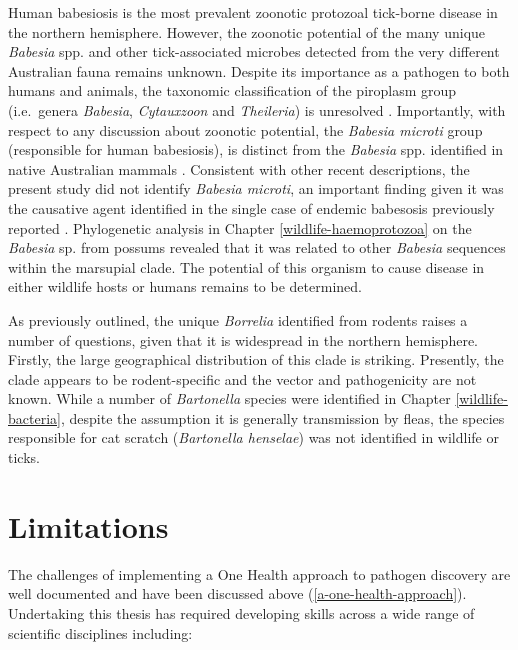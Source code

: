 \documentclass[a4paper, nobind]{templates/ociamthesis}
\begin{document}
Human babesiosis is the most prevalent zoonotic protozoal tick-borne disease in the northern hemisphere.
However, the zoonotic potential of the many unique \emph{Babesia} spp. and other tick-associated microbes detected from the very different Australian fauna remains unknown.
Despite its importance as a pathogen to both humans and animals, the taxonomic classification of the piroplasm group (i.e.~genera \emph{Babesia}, \emph{Cytauxzoon} and \emph{Theileria}) is unresolved \autocite{papariniFirstMolecularCharacterization2015,schreegMitochondrialGenomeSequences2016,barbosaSequenceAnalysesMitochondrial2019}.
Importantly, with respect to any discussion about zoonotic potential, the \emph{Babesia microti} group (responsible for human babesiosis), is distinct from the \emph{Babesia} spp. identified in native Australian mammals \autocite{schreegMitochondrialGenomeSequences2016,barbosaSequenceAnalysesMitochondrial2019}.
Consistent with other recent descriptions, the present study did not identify \emph{Babesia microti}, an important finding given it was the causative agent identified in the single case of endemic babesosis previously reported \autocite{senanayakeFirstReportHuman2012}.
Phylogenetic analysis in Chapter \ref{wildlife-haemoprotozoa} on the \emph{Babesia} sp. from possums revealed that it was related to other \emph{Babesia} sequences within the marsupial clade.
The potential of this organism to cause disease in either wildlife hosts or humans remains to be determined.

As previously outlined, the unique \emph{Borrelia} identified from rodents raises a number of questions, given that it is widespread in the northern hemisphere.
Firstly, the large geographical distribution of this clade is striking.
Presently, the clade appears to be rodent-specific and the vector and pathogenicity are not known.
While a number of \emph{Bartonella} species were identified in Chapter \ref{wildlife-bacteria}, despite the assumption it is generally transmission by fleas, the species responsible for cat scratch (\emph{Bartonella henselae}) was not identified in wildlife or ticks.

\hypertarget{limitations-1}{%
\section{Limitations}\label{limitations-1}}

The challenges of implementing a One Health approach to pathogen discovery are well documented \autocite{steeleWhatMakesEffective2019,predictconsortiumImplementingOneHealth2020} and have been discussed above (\ref{a-one-health-approach}).
Undertaking this thesis has required developing skills across a wide range of scientific disciplines including:
\end{document}
